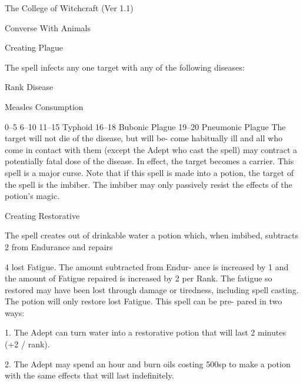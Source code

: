\begin{Chapter}{The College of Witchcraft (Ver 1.1)}
\begin{spell}[S-7]{Converse With Animals }
\begin{effects}
\end{effects}
\end{spell}

\begin{spell}[S-8]{Creating Plague }

\begin{effects}
The spell infects any one target with any of 
the following diseases: 

Rank  Disease 

Measles 
Consumption 

0–5 
6–10 
11–15  Typhoid 
16–18  Bubonic Plague 
19–20  Pneumonic Plague 
The  target  will  not  die  of  the  disease,  but  will  be-
come  habitually  ill  and  all  who  come  in  contact 
with  them  (except  the  Adept  who  cast  the  spell) 
may contract a potentially fatal dose of the disease. 
In effect, the target becomes a carrier. This spell is 
a major curse. Note that if this spell is made into a 
potion,  the  target  of  the  spell  is  the  imbiber.  The 
imbiber may only passively resist the effects of the 
potion’s magic. 

\end{effects}
\end{spell}

\begin{spell}[S-9]{Creating Restorative }

\begin{effects}
 The  spell  creates  out  of  drinkable  water  a 
potion  which,  when  imbibed,  subtracts  2  from 
Endurance and repairs 

4 lost Fatigue. The amount subtracted from Endur-
ance  is  increased  by  1  and  the  amount  of  Fatigue 
repaired is increased by 2 per Rank. The fatigue so 
restored  may  have  been  lost  through  damage  or 
tiredness,  including  spell  casting.  The  potion  will 
only  restore  lost  Fatigue.  This  spell  can  be  pre-
pared in two ways: 

1.  The  Adept  can  turn  water  into  a  restorative 
potion that will last 2 minutes (+2 / rank). 

2.  The  Adept  may  spend  an  hour  and  burn  oils 
costing  500sp  to  make  a  potion  with  the  same 
effects that will last indefinitely. 


\end{effects}
\end{spell}
\end{Chapter}
